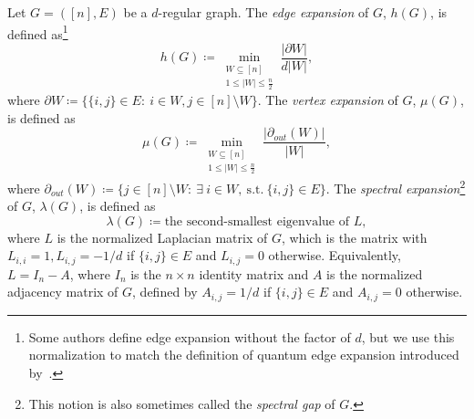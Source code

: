 \documentclass[11pt]{article}
\theoremstyle{plain}
\numberwithin{equation}{section}
\theoremstyle{definition}
\begin{document}
Let $G=([n],E)$ be a $d$-regular graph. The \emph{edge expansion} of $G$, $h(G)$, is defined as\footnote{Some authors define edge expansion without the factor of $d$, but we use this normalization to match the definition of quantum edge expansion introduced by~\cite{PhysRevA.76.032315}.}
\begin{equation}\label{eq: graph edge expansion}
h(G)\coloneqq \min_{\substack{W \subseteq [n]\\1\leq|W|\leq\frac{n}{2}}}\frac{|\partial W|}{d|W|},
\end{equation}
where $\partial W\coloneqq \{\{i,j\}\in E:~i\in W, j\in [n]\setminus W\}$. The \emph{vertex expansion} of $G$, $\mu(G)$, is defined as
\begin{equation}\label{eq: graph vertex expansion}
\mu(G)\coloneqq \min_{\substack{W \subseteq [n]\\1\leq|W|\leq\frac{n}{2}}}\frac{|\partial_{out}(W)|}{|W|},
\end{equation}
where $\partial_{out}(W)\coloneqq \{j\in [n]\setminus W:~\exists\ i\in W, ~\text{s.t.}~\{i,j\}\in E\}$.
The \emph{spectral expansion}\footnote{This notion is also sometimes called the \emph{spectral gap} of $G$.} of $G$, $\lambda(G)$, is defined as
\begin{equation}
    \lambda(G) \coloneqq \text{the second-smallest eigenvalue of }L\label{eq:graph spectral expansion},
\end{equation}
where $L$ is the normalized Laplacian matrix of $G$, which is the matrix with
$L_{i,i}=1, L_{i,j}=-1/d$ if $\{i,j\}\in E$ and $L_{i,j}=0$ otherwise. 
Equivalently, $L=I_n-A$, where $I_n$ is the $n\times n$ identity matrix and $A$ is the normalized adjacency matrix of $G$, defined by
$A_{i,j}=1/d$ if $\{i,j\}\in E$ and $A_{i,j}=0$ otherwise. 
\end{document}
